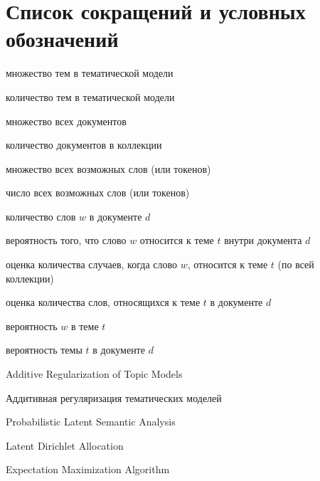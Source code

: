 \chapter*{Список сокращений и условных обозначений} %
\begin{description}[align=right,leftmargin=3.5cm]

\item[\(T\)] множество тем в тематической модели
\item[\(|T|\)] количество тем в тематической модели
\item[\(D\)] множество всех документов
\item[\(|D|\)] количество документов в коллекции
\item[\(W\)] множество всех возможных слов (или токенов)
\item[\(|W|\)] число всех возможных слов (или токенов)

\item[\(n_{wd}\)] количество слов $w$ в документе $d$
\item[\(p_{tdw}\)] вероятность того, что слово $w$ относится к теме $t$ внутри документа $d$
\item[\(n_{wt}\)] оценка количества случаев, когда слово $w$, относится к теме $t$ (по всей коллекции)
\item[\(n_{td}\)] оценка количества слов, относящихся к теме $t$ в документе $d$
\item[\(\phi_{wt}\)] вероятность $w$ в теме $t$
\item[\(\theta_{td}\)] вероятность темы $t$ в документе $d$

\item[ARTM] Additive Regularization of Topic Models
\item[АРТМ] Аддитивная регуляризация тематических моделей
\item[PLSA] Probabilistic Latent Semantic Analysis
\item[LDA] Latent Dirichlet Allocation
\item[EM] Expectation Maximization Algorithm
\end{description}
